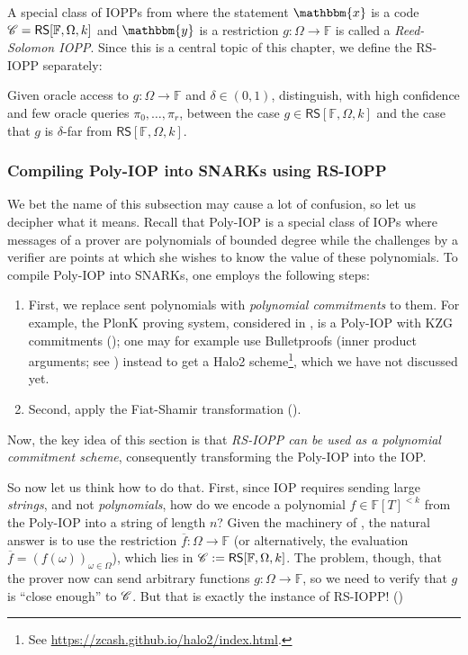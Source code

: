 \documentclass[../../book]{subfiles}
\begin{document}
A special class of IOPPs from  where the statement $\mathbbm{x}$ is a code $\mathscr{C} = \mathsf{RS}[\mathbb{F},\Omega,k]$ and $\mathbbm{y}$ is a restriction $g: \Omega \to \mathbb{F}$ is called a \emph{Reed-Solomon IOPP}.
Since this is a central topic of this chapter, we define the RS-IOPP separately:
\begin{definition}\label{def:rs-proximity}
  Given oracle access to $g: \Omega \to \mathbb{F}$ and $\delta \in (0,1)$, distinguish, with high confidence and few oracle queries $\pi_0,\dots,\pi_r$, between the case $g \in \mathsf{RS}[\mathbb{F}, \Omega, k]$ and the case that $g$ is $\delta$-far from $\mathsf{RS}[\mathbb{F}, \Omega, k]$.
\end{definition}

\subsubsection{Compiling Poly-IOP into SNARKs using RS-IOPP}

We bet the name of this subsection may cause a lot of confusion, so let us decipher what it means. 
Recall that Poly-IOP is a special class of IOPs where messages of a prover are polynomials of bounded degree while the challenges by a verifier are points at which she wishes to know the value of these polynomials.
To compile Poly-IOP into SNARKs, one employs the following steps:
\begin{enumerate}
  \item First, we replace sent polynomials with \emph{polynomial commitments} to them. 
  For example, the PlonK proving system, considered in , is a Poly-IOP with KZG commitments (); one may for example use Bulletproofs (inner product arguments; see ) instead to get a Halo2 scheme\footnote{See \url{https://zcash.github.io/halo2/index.html}.}, which we have not discussed yet.
  \item Second, apply the Fiat-Shamir transformation ().
\end{enumerate}

Now, the key idea of this section is that \emph{RS-IOPP can be used as a polynomial commitment scheme}, consequently transforming the Poly-IOP into the IOP. 

So now let us think how to do that. First, since IOP requires sending large \emph{strings}, and not \emph{polynomials}, how do we encode a polynomial $f \in \mathbb{F}[T]^{<k}$ from the Poly-IOP into a string of length $n$?
Given the machinery of , the natural answer is to use the restriction $\overline{f}: \Omega \to \mathbb{F}$ (or alternatively, the evaluation $\overline{f} = (f(\omega))_{\omega \in \Omega}$), which lies in $\mathscr{C} := \mathsf{RS}[\mathbb{F},\Omega,k]$.
The problem, though, that the prover now can send arbitrary functions $g: \Omega \to \mathbb{F}$, so we need to verify that $g$ is ``close enough'' to $\mathscr{C}$.
But that is exactly the instance of RS-IOPP! ()
\end{document}

